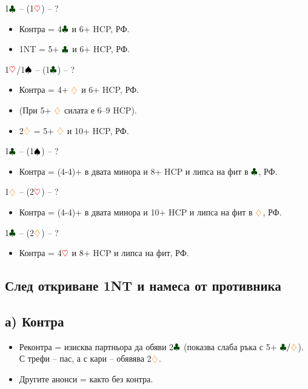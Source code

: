 \documentclass[10pt,a5paper]{extarticle}
\newcommand{\Rheart}{\textcolor{red}{\heartsuit}}
\newcommand{\Rdiamond}{\textcolor{orange}{\diamondsuit}}
\newcommand{\Bspade}{\textcolor{black}{\spadesuit}}
\newcommand{\Bclub}{\textcolor{darkgreen}{\clubsuit}}
\begin{document}
1$\Bclub$ -- (1$\Rheart$) -- ?  
\begin{itemize}
    \item Контра = 4$\Bclub$ и 6+ HCP, РФ.  
    \item 1NT = 5+ $\Bclub$ и 6+ HCP, РФ.
\end{itemize}

1$\Rheart$/1$\Bspade$ -- (1$\Bclub$) -- ?  
\begin{itemize}
    \item Контра = 4+ $\Rdiamond$ и 6+ HCP, РФ.  
    \item (При 5+ $\Rdiamond$ силата е 6--9 HCP).  
    \item 2$\Rdiamond$ = 5+ $\Rdiamond$ и 10+ HCP, РФ.
\end{itemize}

1$\Bclub$ -- (1$\Bspade$) -- ?  
\begin{itemize}
    \item Контра = (4-4)+ в двата минора и 8+ HCP и липса на фит в $\Bclub$, РФ.
\end{itemize}

1$\Rdiamond$ -- (2$\Rheart$) -- ?  
\begin{itemize}
    \item Контра = (4-4)+ в двата минора и 10+ HCP и липса на фит в $\Rdiamond$, РФ.
\end{itemize}

1$\Bclub$ -- (2$\Rdiamond$) -- ?  
\begin{itemize}
    \item Контра = 4$\Rheart$ и 8+ HCP и липса на фит, РФ.
\end{itemize}

\subsection*{След откриване 1NT и намеса от противника}

\subsection*{а) Контра}
\begin{itemize}
    \item Реконтра = изисква партньора да обяви 2$\Bclub$ (показва слаба ръка с 5+ $\Bclub/\Rdiamond$).  
        \quad С трефи -- пас, а с кари -- обявява 2$\Rdiamond$.
    \item Другите анонси = както без контра.
\end{itemize}
\end{document}
